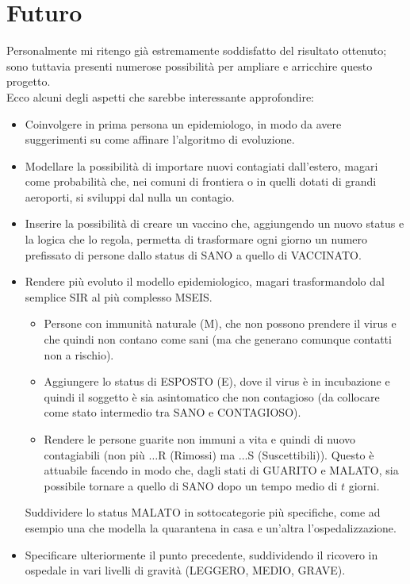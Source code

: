 \documentclass[a4paper, 12pt]{article}
\begin{document}
\newpage

\section{Futuro}
	\label{sec:fut}
	Personalmente mi ritengo già estremamente soddisfatto del risultato ottenuto; sono tuttavia presenti numerose possibilità per ampliare e arricchire questo progetto.\\
	Ecco alcuni degli aspetti che sarebbe interessante approfondire:
	
	\begin{itemize}
		\item Coinvolgere in prima persona un epidemiologo, in modo da avere suggerimenti su come affinare l'algoritmo di evoluzione.
		\item Modellare la possibilità di importare nuovi contagiati dall'estero, magari come probabilità che, nei comuni di frontiera o in quelli dotati di grandi aeroporti, si sviluppi dal nulla un contagio.
		\item Inserire la possibilità di creare un vaccino che, aggiungendo un nuovo status e la logica che lo regola, permetta di trasformare ogni giorno un numero prefissato di persone dallo status di SANO a quello di VACCINATO.
		\item Rendere più evoluto il modello epidemiologico, magari trasformandolo dal semplice SIR al più complesso MSEIS.
		\begin{itemize}
			\item Persone con immunità naturale (M), che non possono prendere il virus e che quindi non contano come sani (ma che generano comunque contatti non a rischio).
			\item Aggiungere lo status di ESPOSTO (E), dove il virus è in incubazione e quindi il soggetto è sia asintomatico che non contagioso (da collocare come stato intermedio tra SANO e CONTAGIOSO).
			\item Rendere le persone guarite non immuni a vita e quindi di nuovo contagiabili (non più $\dots{}$R (Rimossi) ma $\dots{}$S (Suscettibili)).
			Questo è attuabile facendo in modo che, dagli stati di GUARITO e MALATO, sia possibile tornare a quello di SANO dopo un tempo medio di $t$ giorni.
		\end{itemize}
		Suddividere lo status MALATO in sottocategorie più specifiche, come ad esempio una che modella la quarantena in casa e un'altra l'ospedalizzazione.
		\item Specificare ulteriormente il punto precedente, suddividendo il ricovero in ospedale in vari livelli di gravità (LEGGERO, MEDIO, GRAVE).

\end{itemize}
\end{document}
